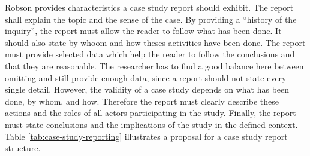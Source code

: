 \documentclass[runningheads]{llncs}
\begin{document}
Robson \cite{robson2002real} provides characteristics a case study report should exhibit. The report shall explain the topic and the sense of the case. By providing a ``history of the inquiry'', the report must allow the reader to follow what has been done. It should also state by whoom and how theses activities have been done. The report must provide selected data which help the reader to follow the conclusions and that they are reasonable. The researcher has to find a good balance here between omitting and still provide enough data, since a report should not state every single detail. However, the validity of a case study depends on what has been done, by whom, and how. Therefore the report must clearly describe these actions and the roles of all actors participating in the study. Finally, the report must state conclusions and the implications of the study in the defined context. Table \ref{tab:case-study-reporting} illustrates a proposal for a case study report structure.
\end{document}
